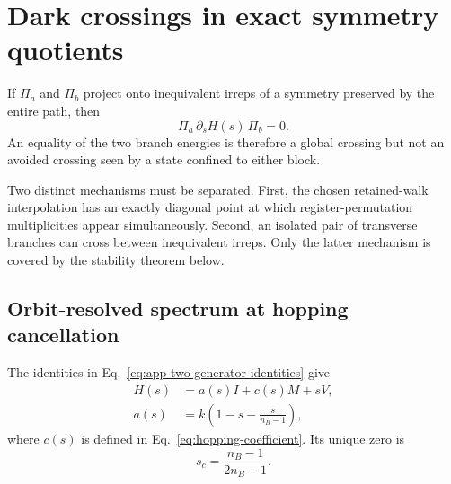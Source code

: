 \section{Dark crossings in exact symmetry quotients}
\label{sec:rewrite-crossings}

If $\Pi_a$ and $\Pi_b$ project onto inequivalent irreps of a symmetry
preserved by the entire path, then
\begin{equation}
 \Pi_a\,\partial_sH(s)\,\Pi_b=0.
 \label{eq:dark-coupling-rewrite}
\end{equation}
An equality of the two branch energies is therefore a global crossing but
not an avoided crossing seen by a state confined to either block.

Two distinct mechanisms must be separated.  First, the chosen retained-walk
interpolation has an exactly diagonal point at which register-permutation
multiplicities appear simultaneously.  Second, an isolated pair of
transverse branches can cross between inequivalent irreps.  Only the latter
mechanism is covered by the stability theorem below.

\subsection{Orbit-resolved spectrum at hopping cancellation}

The identities in Eq.~\eqref{eq:app-two-generator-identities} give
\begin{align}
 H(s)&=a(s)I+c(s)M+sV,\\
 a(s)&=k\left(1-s-\frac{s}{n_B-1}\right),
 \label{eq:path-transport-decomposition}
\end{align}
where $c(s)$ is defined in Eq.~\eqref{eq:hopping-coefficient}.  Its unique
zero is
\begin{equation}
 s_c=\frac{n_B-1}{2n_B-1}.
 \label{eq:cycle-cancel-rewrite}
\end{equation}

